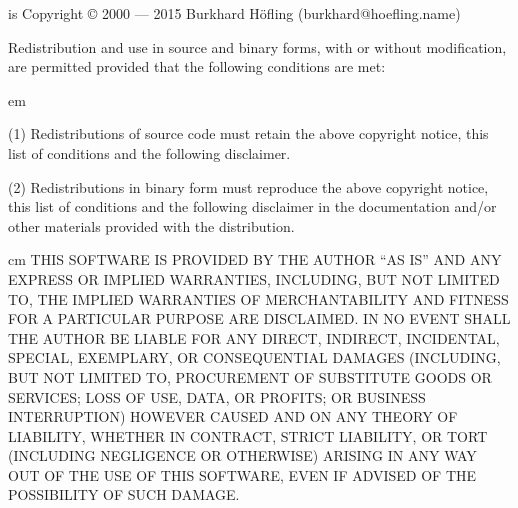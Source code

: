 
{\CRISP} is Copyright © 2000 --- 2015 Burkhard Höfling (burkhard@hoefling.name)

Redistribution and use in source and binary forms, with or without
modification, are permitted provided that the following conditions are
met:
\medskip

{ em
\item{(1)} Redistributions of source code must retain the above copyright
    notice, this list of conditions and the following disclaimer. 

\item{(2)} Redistributions in binary form must reproduce the above copyright
    notice, this list of conditions and the following disclaimer in
    the documentation and/or other materials provided with the
    distribution. \par}
\medskip
    
{ cm 
THIS SOFTWARE IS PROVIDED BY THE AUTHOR ``AS IS'' AND ANY EXPRESS OR
IMPLIED WARRANTIES, INCLUDING, BUT NOT LIMITED TO, THE IMPLIED
WARRANTIES OF MERCHANTABILITY AND FITNESS FOR A PARTICULAR PURPOSE ARE
DISCLAIMED. IN NO EVENT SHALL THE AUTHOR BE LIABLE FOR ANY DIRECT,
INDIRECT, INCIDENTAL, SPECIAL, EXEMPLARY, OR CONSEQUENTIAL DAMAGES
(INCLUDING, BUT NOT LIMITED TO, PROCUREMENT OF SUBSTITUTE GOODS OR
SERVICES; LOSS OF USE, DATA, OR PROFITS; OR BUSINESS INTERRUPTION)
HOWEVER CAUSED AND ON ANY THEORY OF LIABILITY, WHETHER IN CONTRACT,
STRICT LIABILITY, OR TORT (INCLUDING NEGLIGENCE OR OTHERWISE) ARISING
IN ANY WAY OUT OF THE USE OF THIS SOFTWARE, EVEN IF ADVISED OF THE
POSSIBILITY OF SUCH DAMAGE.\par}


